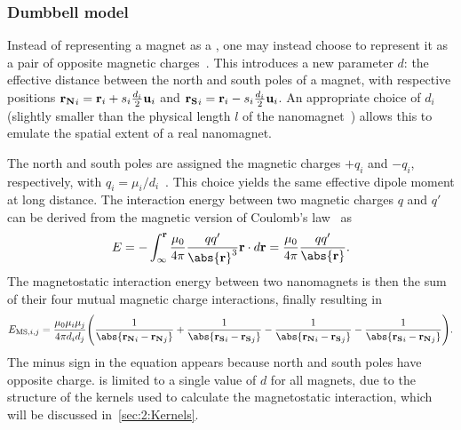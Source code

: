\subsubsection{Dumbbell model}\label{sec:2:Dumbbell}
Instead of representing a magnet as a , one may instead choose to represent it as a pair of opposite magnetic charges~\cite{MagneticMonopoles2008,MagneticMonopoleDynamics}.
This introduces a new parameter $d$: the effective distance between the north and south poles of a magnet, with respective positions $\boldsymbol{\mathbf{r_N}}_i = \boldsymbol{\mathbf{r}}_i + s_i\frac{d_i}{2}\boldsymbol{\mathbf{u}}_i$ and $\boldsymbol{\mathbf{r_S}}_i = \boldsymbol{\mathbf{r}}_i - s_i\frac{d_i}{2}\boldsymbol{\mathbf{u}}_i$.
An appropriate choice of $d_i$ (slightly smaller than the physical length $l$ of the nanomagnet~\cite{DDG_Masterproef}) allows this  to emulate the spatial extent of a real nanomagnet. \par
The north and south poles are assigned the magnetic charges $+q_i$ and $-q_i$, respectively, with $q_i=\mu_i/d_i$~\cite{MagneticMonopoles2008}.
This choice yields the same effective dipole moment at long distance.
The interaction energy between two magnetic charges $q$ and $q'$ can be derived from the magnetic version of Coulomb's law~\cite{ForceMagneticDipole} as
\begin{equation}
	E = -\int_\infty^{\vc{r}} \frac{\mu_0}{\num{4}\pi}\frac{qq'}{\abs{\vc{r}}^3} \vc{r} \cdot d\vc{r} = \frac{\mu_0}{\num{4}\pi} \frac{qq'}{\abs{\vc{r}}} \mathrm{.}
\end{equation}
The magnetostatic interaction energy between two nanomagnets is then the sum of their four mutual magnetic charge interactions, finally resulting in
\begin{equation}
	E_{\mathrm{MS},i,j} = \frac{\mu_0 \mu_i \mu_j}{4\pi d_i d_j} \Bigg(\frac{1}{\abs{\mathbf{r_N}_i - \mathbf{r_N}_j}} + \frac{1}{\abs{\mathbf{r_S}_i - \mathbf{r_S}_j}}\\ - \frac{1}{\abs{\mathbf{r_N}_i - \mathbf{r_S}_j}} - \frac{1}{\abs{\mathbf{r_S}_i - \mathbf{r_N}_j}}\Bigg) \mathrm{.} \label{eq:2:E_MS_mono}
\end{equation}
The minus sign in the equation appears because north and south poles have opposite charge.
\hotspice is limited to a single value of $d$ for all magnets, due to the structure of the kernels used to calculate the magnetostatic interaction, which will be discussed in~\cref{sec:2:Kernels}.

